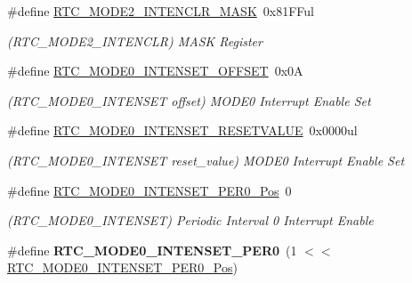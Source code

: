 \begin{DoxyCompactItemize}
\item 
\hypertarget{group___s_a_m_l21___r_t_c_ga333990dfd2e15d1a03dcc1a2393744fc}{}\#define \hyperlink{group___s_a_m_l21___r_t_c_ga333990dfd2e15d1a03dcc1a2393744fc}{R\+T\+C\+\_\+\+M\+O\+D\+E2\+\_\+\+I\+N\+T\+E\+N\+C\+L\+R\+\_\+\+M\+A\+S\+K}~0x81\+F\+Ful\label{group___s_a_m_l21___r_t_c_ga333990dfd2e15d1a03dcc1a2393744fc}

\begin{DoxyCompactList}\small\item\em (R\+T\+C\+\_\+\+M\+O\+D\+E2\+\_\+\+I\+N\+T\+E\+N\+C\+L\+R) M\+A\+S\+K Register \end{DoxyCompactList}\item 
\hypertarget{group___s_a_m_l21___r_t_c_gace79c596916b99bc14b07c14ccf43344}{}\#define \hyperlink{group___s_a_m_l21___r_t_c_gace79c596916b99bc14b07c14ccf43344}{R\+T\+C\+\_\+\+M\+O\+D\+E0\+\_\+\+I\+N\+T\+E\+N\+S\+E\+T\+\_\+\+O\+F\+F\+S\+E\+T}~0x0\+A\label{group___s_a_m_l21___r_t_c_gace79c596916b99bc14b07c14ccf43344}

\begin{DoxyCompactList}\small\item\em (R\+T\+C\+\_\+\+M\+O\+D\+E0\+\_\+\+I\+N\+T\+E\+N\+S\+E\+T offset) M\+O\+D\+E0 Interrupt Enable Set \end{DoxyCompactList}\item 
\hypertarget{group___s_a_m_l21___r_t_c_ga73cabe63b8ff785e8c852bd67689766a}{}\#define \hyperlink{group___s_a_m_l21___r_t_c_ga73cabe63b8ff785e8c852bd67689766a}{R\+T\+C\+\_\+\+M\+O\+D\+E0\+\_\+\+I\+N\+T\+E\+N\+S\+E\+T\+\_\+\+R\+E\+S\+E\+T\+V\+A\+L\+U\+E}~0x0000ul\label{group___s_a_m_l21___r_t_c_ga73cabe63b8ff785e8c852bd67689766a}

\begin{DoxyCompactList}\small\item\em (R\+T\+C\+\_\+\+M\+O\+D\+E0\+\_\+\+I\+N\+T\+E\+N\+S\+E\+T reset\+\_\+value) M\+O\+D\+E0 Interrupt Enable Set \end{DoxyCompactList}\item 
\hypertarget{group___s_a_m_l21___r_t_c_ga8abbe001f6282c5bee418701bddae01c}{}\#define \hyperlink{group___s_a_m_l21___r_t_c_ga8abbe001f6282c5bee418701bddae01c}{R\+T\+C\+\_\+\+M\+O\+D\+E0\+\_\+\+I\+N\+T\+E\+N\+S\+E\+T\+\_\+\+P\+E\+R0\+\_\+\+Pos}~0\label{group___s_a_m_l21___r_t_c_ga8abbe001f6282c5bee418701bddae01c}

\begin{DoxyCompactList}\small\item\em (R\+T\+C\+\_\+\+M\+O\+D\+E0\+\_\+\+I\+N\+T\+E\+N\+S\+E\+T) Periodic Interval 0 Interrupt Enable \end{DoxyCompactList}\item 
\hypertarget{group___s_a_m_l21___r_t_c_ga523e509ab19e568f2bb579098f554f60}{}\#define {\bfseries R\+T\+C\+\_\+\+M\+O\+D\+E0\+\_\+\+I\+N\+T\+E\+N\+S\+E\+T\+\_\+\+P\+E\+R0}~(1 $<$$<$ \hyperlink{group___s_a_m_l21___r_t_c_ga8abbe001f6282c5bee418701bddae01c}{R\+T\+C\+\_\+\+M\+O\+D\+E0\+\_\+\+I\+N\+T\+E\+N\+S\+E\+T\+\_\+\+P\+E\+R0\+\_\+\+Pos})\label{group___s_a_m_l21___r_t_c_ga523e509ab19e568f2bb579098f554f60}


\end{DoxyCompactItemize}
